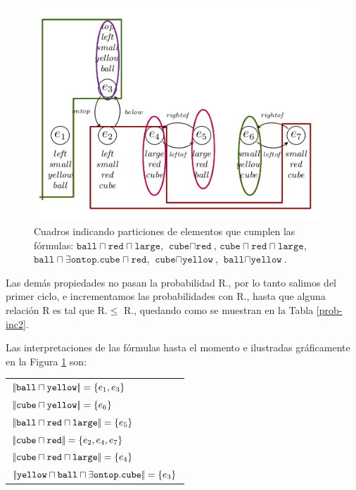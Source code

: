 \begin{figure}[H]
\begin{center}
\includegraphics[width=11cm]{images/im/yellow.png}

\caption{Cuadros indicando particiones de elementos que cumplen las
  f\'ormulas: 
$\texttt{ball} \sqcap \texttt{red} \sqcap \texttt{large}$,
$\texttt{cube} \sqcap \texttt{red}$, 
$\texttt{cube} \sqcap \texttt{red} \sqcap \texttt{large}$,
$\texttt{ball} \sqcap \exists \texttt{ontop}. \texttt{cube} \sqcap
\texttt{red}$, 
$\texttt{cube} \sqcap \texttt{yellow}$, 
$\texttt{ball} \sqcap \texttt{yellow}$.}
\label{fig-modelo9d}
\end{center}
\end{figure}


Las dem\'as propiedades no pasan la probabilidad R.\randomuse, por lo tanto salimos del primer ciclo, e incrementamos las probabilidades con R.\incuse, hasta que alguna relaci\'on R es tal que R.\randomuse $\leq$ R.\puse, quedando como se muestran en la Tabla \ref{prob-inc2}.

Las interpretaciones de las f\'ormulas hasta el momento e ilustradas gr\'aficamente en la Figura \ref{fig-modelo9d} son:

\begin{tabular}{l}
$|\!|\texttt{ball} \sqcap \texttt{yellow}|\!| = \{e_1, e_3\}$\\
$|\!|\texttt{cube} \sqcap \texttt{yellow} |\!|= \{e_6\}$ \\
$|\!|\texttt{ball} \sqcap \texttt{red} \sqcap \texttt{large}|\!| = \{e_5\}$ \\
$|\!|\texttt{cube} \sqcap \texttt{red} |\!|= \{e_2, e_4, e_7\}$ \\
$|\!|\texttt{cube} \sqcap \texttt{red} \sqcap \texttt{large}|\!| = \{e_4\}$  \\
$|\!|\texttt{yellow} \sqcap \texttt{ball} \sqcap \exists \texttt{ontop}.\texttt{cube}|\!| = \{e_3\} $
\end{tabular}
\medskip

